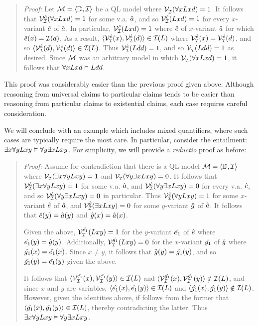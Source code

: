 \begin{quote}
\label{allmodels5}
  \textit{Proof:}
  Let $\mathcal{M}=\langle\mathbb{D},\mathcal{I}\rangle$ be a QL model where $\mathcal{V}_{\mathcal{I}}^{}(\forall xLxd)=1$.
  It follows that $\mathcal{V}_{\mathcal{I}}^{\hat{a}}(\forall xLxd)=1$ for some v.a. $\hat{a}$, and so $\mathcal{V}_{\mathcal{I}}^{\hat{c}}(Lxd)=1$ for every $x$-variant $\hat{c}$ of $\hat{a}$.
  In particular, $\mathcal{V}_{\mathcal{I}}^{\hat{e}}(Lxd)=1$ where $\hat{e}$ of $x$-variant $\hat{a}$ for which $\hat{e}(x)=\mathcal{I}(d)$.
  As a result, $\langle\mathcal{V}_{\mathcal{I}}^{\hat{e}}(x),\mathcal{V}_{\mathcal{I}}^{\hat{e}}(d)\rangle\in\mathcal{I}(L)$ where $\mathcal{V}_{\mathcal{I}}^{\hat{e}}(x)=\mathcal{V}_{\mathcal{I}}^{\hat{e}}(d)$, and so $\langle\mathcal{V}_{\mathcal{I}}^{\hat{e}}(d),\mathcal{V}_{\mathcal{I}}^{\hat{e}}(d)\rangle\in\mathcal{I}(L)$.
  Thus $\mathcal{V}_{\mathcal{I}}^{\hat{e}}(Ldd)=1$, and so $\mathcal{V}_{\mathcal{I}}^{}(Ldd)=1$ as desired.
  Since $\mathcal{M}$ was an arbitrary model in which $\mathcal{V}_{\mathcal{I}}^{}(\forall xLxd)=1$, it follows that $\forall xLxd \vDash Ldd$.
\end{quote}

This proof was considerably easier than the previous proof given above.
Although reasoning from universal claims to particular claims tends to be easier than reasoning from particular claims to existential claims, each case requires careful consideration.

We will conclude with an example which includes mixed quantifiers, where such cases are typically require the most care.
In particular, consider the entailment: $\exists x\forall yLxy \vDash \forall y\exists xLxy$.
For simplicity, we will provide a \textit{reductio} proof as before:

\begin{quote}
\label{allmodels6}
  \textit{Proof:}
  Assume for contradiction that there is a QL model $\mathcal{M}=\langle\mathbb{D},\mathcal{I}\rangle$ where $\mathcal{V}_{\mathcal{I}}^{}(\exists x\forall yLxy)=1$ and $\mathcal{V}_{\mathcal{I}}^{}(\forall y\exists xLxy)=0$.
  It follows that $\mathcal{V}_{\mathcal{I}}^{\hat{a}}(\exists x\forall yLxy)=1$ for some v.a. $\hat{a}$, and $\mathcal{V}_{\mathcal{I}}^{\hat{c}}(\forall y\exists xLxy)=0$ for every v.a. $\hat{c}$, and so $\mathcal{V}_{\mathcal{I}}^{\hat{a}}(\forall y\exists xLxy)=0$ in particular.
  Thus $\mathcal{V}_{\mathcal{I}}^{\hat{e}}(\forall yLxy)=1$ for some $x$-variant $\hat{e}$ of $\hat{a}$, and $\mathcal{V}_{\mathcal{I}}^{\hat{g}}(\exists xLxy)=0$ for some $y$-variant $\hat{g}$ of $\hat{a}$.
  It follows that $\hat{e}(y)=\hat{a}(y)$ and $\hat{g}(x)=\hat{a}(x)$.

  Given the above, $\mathcal{V}_{\mathcal{I}}^{\hat{e_1}}(Lxy)=1$ for the $y$-variant $\hat{e_1}$ of $\hat{e}$ where $\hat{e_1}(y)=\hat{g}(y)$.
  Additionally, $\mathcal{V}_{\mathcal{I}}^{\hat{g_1}}(Lxy)=0$ for the $x$-variant $\hat{g_1}$ of $\hat{g}$ where $\hat{g_1}(x)=\hat{e_1}(x)$.
  Since $x\neq y$, it follows that $\hat{g}(y)=\hat{g_1}(y)$, and so $\hat{g_1}(y)=\hat{e_1}(y)$ given the above. 

  It follows that $\langle\mathcal{V}_{\mathcal{I}}^{\hat{e_1}}(x),\mathcal{V}_{\mathcal{I}}^{\hat{e_1}}(y)\rangle\in\mathcal{I}(L)$ and $\langle\mathcal{V}_{\mathcal{I}}^{\hat{g_1}}(x),\mathcal{V}_{\mathcal{I}}^{\hat{g_1}}(y)\rangle\notin\mathcal{I}(L)$, and since $x$ and $y$ are variables, $\langle\hat{e_1}(x),\hat{e_1}(y)\rangle\in\mathcal{I}(L)$ and $\langle\hat{g_1}(x),\hat{g_1}(y)\rangle\notin\mathcal{I}(L)$.
  However, given the identities above, if follows from the former that $\langle\hat{g_1}(x),\hat{g_1}(y)\rangle\in\mathcal{I}(L)$, thereby contradicting the latter.
  Thus $\exists x\forall yLxy \vDash \forall y\exists xLxy$.
\end{quote}

